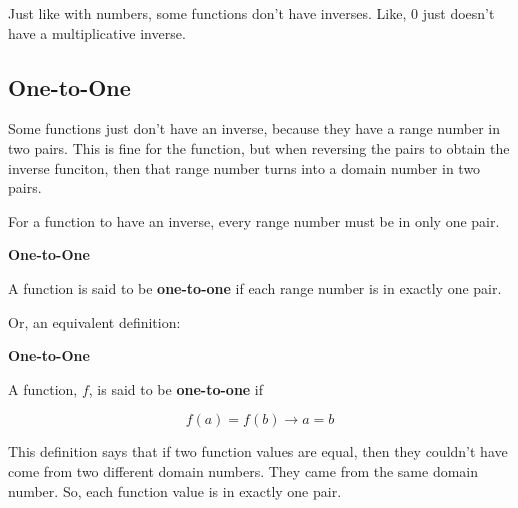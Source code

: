 \documentclass{ximera}
\begin{document}
Just like with numbers, some functions don't have inverses.  Like, $0$ just doesn't have a multiplicative inverse.














\subsection*{One-to-One}


Some functions just don't have an inverse, because they have a range number in two pairs.  This is fine for the function, but when reversing the pairs to obtain the inverse funciton, then that range number turns into a domain number in two pairs.


For a function to have an inverse, every range number must be in only one pair.



\begin{idea} \textbf{\textcolor{blue!55!black}{One-to-One}} 

A function is said to be \textbf{one-to-one} if each range number is in exactly one pair.

\end{idea}





Or, an equivalent definition:

\begin{idea} \textbf{\textcolor{blue!55!black}{One-to-One}} 


A function, $f$, is said to be \textbf{one-to-one} if 


\[    f(a) = f(b) \rightarrow a = b           \]

\end{idea}





This definition says that if two function values are equal, then they couldn't have come from two different domain numbers.  They came from the same domain number. So, each function value is in exactly one pair.
\end{document}
